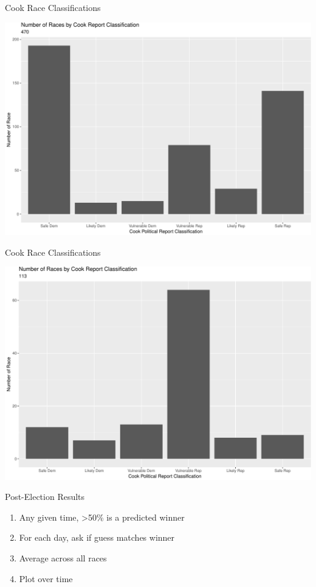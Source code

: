 \documentclass[ignorenonframetext,]{beamer}
\providecommand{\tightlist}{%
  \setlength{\itemsep}{0pt}\setlength{\parskip}{0pt}}
\begin{document}
\begin{frame}{Cook Race Classifications}

\includegraphics{markets_models_files/figure-beamer/class all-1.pdf}

\end{frame}

\begin{frame}{Cook Race Classifications}

\includegraphics{markets_models_files/figure-beamer/class market-1.pdf}

\end{frame}

\begin{frame}{Post-Election Results}

\begin{enumerate}
\def\labelenumi{\arabic{enumi}.}
\tightlist
\item
  Any given time, \textgreater{}50\% is a predicted winner
\item
  For each day, ask if guess matches winner
\item
  Average across all races
\item
  Plot over time
\end{enumerate}

\end{frame}
\end{document}
